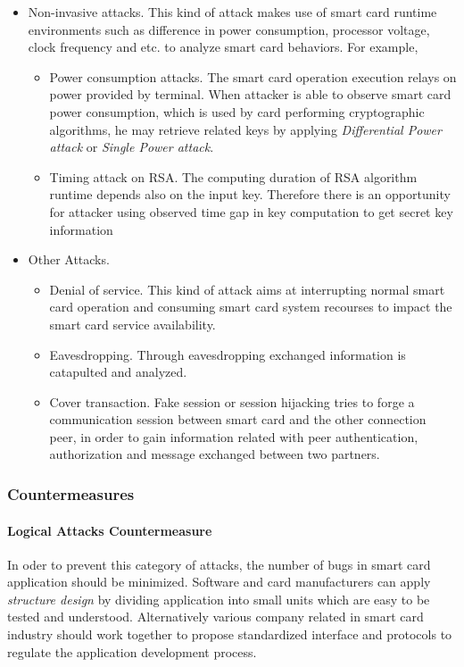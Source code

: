 \begin{itemize}
\begin{itemize}
\end{itemize}
\item Non-invasive attacks. This kind of attack makes use of smart card runtime environments such as difference in power consumption, processor voltage, clock frequency and etc. to analyze smart card behaviors. For example,
\begin{itemize}
\item Power consumption attacks. The smart card operation execution relays on power provided by terminal.  When attacker is able to observe smart card power consumption, which is used by card performing cryptographic algorithms, he may retrieve related keys by applying \emph{Differential Power attack} or \emph{Single Power attack}\cite{smart_card_attack3}.
\item Timing attack on RSA. The computing duration of RSA algorithm runtime depends also on the input key. Therefore there is an opportunity for attacker using observed time gap in key computation to get secret key information\cite{smart_card_history}
\end{itemize}
\item Other Attacks\cite{smart_card_attack5}.
\begin{itemize}
\item Denial of service. This kind of attack aims at interrupting normal smart card operation and consuming smart card system recourses to impact the smart card service availability.
\item Eavesdropping. Through eavesdropping exchanged information is catapulted and analyzed.
\item Cover transaction. Fake session or session hijacking tries to forge a communication session between smart card and the other connection peer, in order to gain information related with peer authentication, authorization and message exchanged between two partners.
\end{itemize}
\end{itemize}

\subsubsection{Countermeasures}
\paragraph{Logical Attacks Countermeasure}
In oder to prevent this category of attacks, the number of bugs in smart card application should be minimized. Software and card manufacturers can apply \emph{structure design} by dividing application into small units which are easy to be tested and understood. Alternatively various company related in smart card industry should work together to propose standardized interface and protocols to regulate the application development process\cite{smart_card_attack2}.
